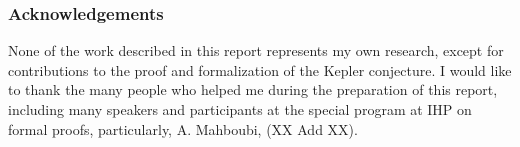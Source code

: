 \documentclass[brochure,english,12pt]{bourbaki}
\theoremstyle{plain}
\begin{document}
\bigskip

\subsubsection{Acknowledgements}

None of the work described in this report represents my own research, except for contributions to the
proof and formalization of the Kepler conjecture.  I would like to thank the many people who helped me
during the preparation of this report, including many speakers and participants at the special program at IHP
on formal proofs, particularly,  A. Mahboubi, (XX Add XX).



\raggedright

\end{document}
